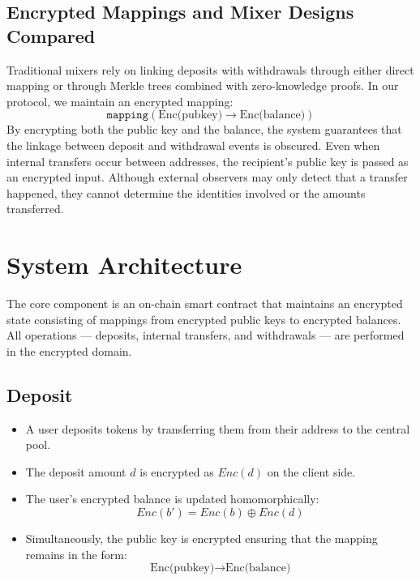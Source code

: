 \documentclass[11pt]{article}
\begin{document}
\subsection{Encrypted Mappings and Mixer Designs Compared}
Traditional mixers rely on linking deposits with withdrawals through either direct mapping or through Merkle trees combined with zero-knowledge proofs. In our protocol, we maintain an encrypted mapping:
\[
\texttt{mapping}(\text{Enc(pubkey)} \rightarrow \text{Enc(balance)})
\]
By encrypting both the public key and the balance, the system guarantees that the linkage between deposit and withdrawal events is obscured. Even when internal transfers occur between addresses, the recipient's public key is passed as an encrypted input. Although external observers may only detect that a transfer happened, they cannot determine the identities involved or the amounts transferred.

\section{System Architecture}

The core component is an on-chain smart contract that maintains an encrypted state consisting of mappings from encrypted public keys to encrypted balances. All operations — deposits, internal transfers, and withdrawals — are performed in the encrypted domain.

\subsection{Deposit}
\begin{itemize}
    \item A user deposits tokens by transferring them from their address to the central pool.
    \item The deposit amount \( d \) is encrypted as \( Enc(d) \) on the client side.
    \item The user's encrypted balance is updated homomorphically:
    \[
    Enc(b') = Enc(b) \oplus Enc(d)
    \]
    \item Simultaneously, the public key is encrypted ensuring that the mapping remains in the form:
    \[
    \text{Enc(pubkey)} \rightarrow \text{Enc(balance)}
    \]
\end{itemize}
\end{document}
